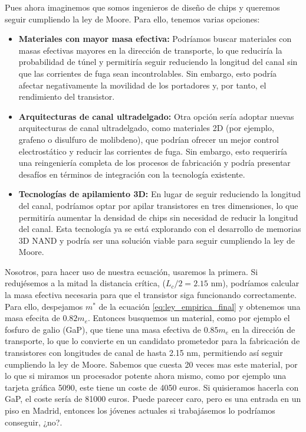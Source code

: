 Pues ahora imaginemos que somos ingenieros de diseño de chips y queremos seguir cumpliendo la ley de Moore. Para ello, tenemos varias opciones:
\begin{itemize}
    \item \textbf{Materiales con mayor masa efectiva:} Podríamos buscar materiales con masas efectivas mayores en la dirección de transporte, lo que reduciría la probabilidad de túnel y permitiría seguir reduciendo la longitud del canal sin que las corrientes de fuga sean incontrolables. Sin embargo, esto podría afectar negativamente la movilidad de los portadores y, por tanto, el rendimiento del transistor.
    \item \textbf{Arquitecturas de canal ultradelgado:} Otra opción sería adoptar nuevas arquitecturas de canal ultradelgado, como  materiales 2D (por ejemplo, grafeno o disulfuro de molibdeno), que podrían ofrecer un mejor control electrostático y reducir las corrientes de fuga. Sin embargo, esto requeriría una reingeniería completa de los procesos de fabricación y podría presentar desafíos en términos de integración con la tecnología existente. \cite{radisavljevic2011mos2}
    \item \textbf{Tecnologías de apilamiento 3D:} En lugar de seguir reduciendo la longitud del canal, podríamos optar por apilar transistores en tres dimensiones, lo que permitiría aumentar la densidad de chips sin necesidad de reducir la longitud del canal. Esta tecnología ya se está explorando con el desarrollo de memorias 3D NAND y podría ser una solución viable para seguir cumpliendo la ley de Moore. \cite{kuhn2012ultimate}
\end{itemize}

Nosotros, para hacer uso de nuestra ecuación, usaremos la primera. Si redujésemos a la mitad la distancia crítica, ($L_c/2 = 2.15$ nm), podríamos calcular la masa efectiva necesaria para que el transistor siga funcionando correctamente. Para ello, despejamos $m^*$ de la ecuación \ref{eq:ley_empirica_final} y obtenemos una masa efecita de $0.82 m_e$. Entonces busquemos un material, como por ejemplo el fosfuro de galio (GaP), que tiene una masa efectiva de $0.85 m_e$ \cite{vurgaftman2001band} en la dirección de transporte, lo que lo convierte en un candidato prometedor para la fabricación de transistores con longitudes de canal de hasta 2.15 nm, permitiendo así seguir cumpliendo la ley de Moore. Sabemos que cuesta 20 veces mas este material, por lo que si miramos un procesador potente ahora mismo, como por ejemplo una tarjeta gráfica 5090, este tiene un coste de 4050 euros. Si quisieramos hacerla con GaP, el coste sería de 81000 euros. Puede parecer caro, pero es una entrada en un piso en Madrid, entonces los jóvenes actuales si trabajásemos lo podríamos conseguir, ¿no?.  

